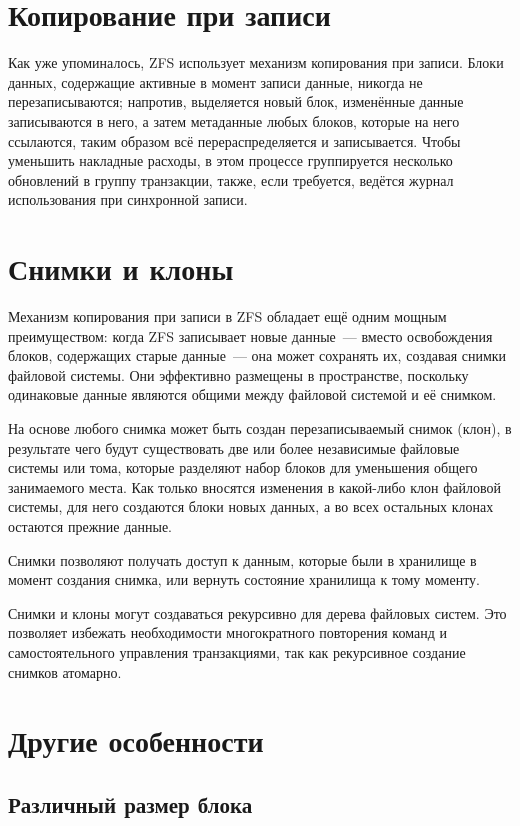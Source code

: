 \documentclass[a4page]{article}
\begin{document}
\section{Копирование при записи}

Как уже упоминалось, ZFS использует механизм копирования при записи.
Блоки данных, содержащие активные в момент записи данные, никогда не перезаписываются;
напротив, выделяется новый блок, изменённые данные записываются в него,
а затем метаданные любых блоков, которые на него ссылаются,
таким образом всё перераспределяется и записывается.
Чтобы уменьшить накладные расходы, в этом процессе группируется несколько обновлений в группу транзакции,
также, если требуется, ведётся журнал использования при синхронной записи.

\section{Снимки и клоны}

Механизм копирования при записи в ZFS обладает ещё одним мощным преимуществом:
когда ZFS записывает новые данные --- вместо освобождения блоков,
содержащих старые данные --- она может сохранять их, создавая снимки файловой системы.
Они эффективно размещены в пространстве, поскольку одинаковые данные являются общими
между файловой системой и её снимком.

На основе любого снимка может быть создан перезаписываемый снимок (клон),
в результате чего будут существовать две или более независимые файловые системы или тома,
которые разделяют набор блоков для уменьшения общего занимаемого места.
Как только вносятся изменения в какой-либо клон файловой системы,
для него создаются блоки новых данных,
а во всех остальных клонах остаются прежние данные.

Снимки позволяют получать доступ к данным, которые были в хранилище в момент создания снимка,
или вернуть состояние хранилища к тому моменту.

Снимки и клоны могут создаваться рекурсивно для дерева файловых систем.
Это позволяет избежать необходимости многократного повторения команд
и самостоятельного управления транзакциями,
так как рекурсивное создание снимков атомарно.

\section{Другие особенности}

\subsection{Различный размер блока}
\end{document}
